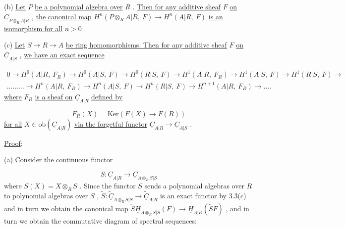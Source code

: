 (b)  \underline{Let}  $P$  \underline{be a polynomial algebra over}  $R$  . \underline{Then for any additive sheaf}  $F$  \underline{on}  $\underline{C}_{P\otimes_R A|R}$  , \underline{the canonical map}  $H^n(P\otimes_R A|R,\ F) \to H^n(A|R,\ F)$  \underline{is an isomorphism for all}  $n > 0$  .

(c)  \underline{Let}  $S \to R \to A$  \underline{be ring homomorphisms. Then for any additive sheaf}  $F$  \underline{on}  $\underline{C}_{A|S}$  , \underline{we have an exact sequence}

{\small \begin{multline*}
0 \to H^0(A|R,\ F_R) \to H^0(A|S,\ F) \to H^0(R|S,\ F) \to H^1(A|R,\ F_R) \to H^1(A|S,\ F) \to H^1(R|S,\ F) \to \\ \ldots\ldots\ldots \to H^n(A|R,\ F_R) \to H^n(A|S,\ F) \to H^n(R|S,\ F) \to H^{n+1}(A|R,\ F_R) \to \ldots.
\end{multline*}}
\underline{where}  $F_R$  \underline{is a sheaf on}  $\underline{C}_{A|R}$ \underline{defined by}

\begin{equation*}
F_R(X) = \mathrm{Ker}(F(X) \to F(R))
\end{equation*}
\underline{for all}  $X \in \mathrm{ob}(\underline{C}_{A|R})$  \underline{via the forgetful functor}  $\underline{C}_{A|R} \to \underline{C}_{A|S}$  .


\underline{Proof}:

(a)  Consider the continuous functor

\begin{equation*}
S : \underline{C}_{A|R} \to \underline{C}_{A\otimes_R S|S}
\end{equation*}
where  $S(X) = X\otimes_R S$  . Since the functor  $S$  sends a polynomial algebras over  $R$  to polynomial algebras over  $S$  ,  $\widetilde{S} : \widetilde{\underline{C}}_{A\otimes_R S|S} \to \widetilde{\underline{C}}_{A|R}$  is an exact functor by 3.3(c) and in turn we obtain the canonical map  $\check{S}\underline{H}^{\cdot}_{A\otimes_R S|S}(F) \to \underline{H}^{\cdot}_{A|R}(\widetilde{S}F)$  , and in turn we obtain the commutative diagram of spectral sequences:

